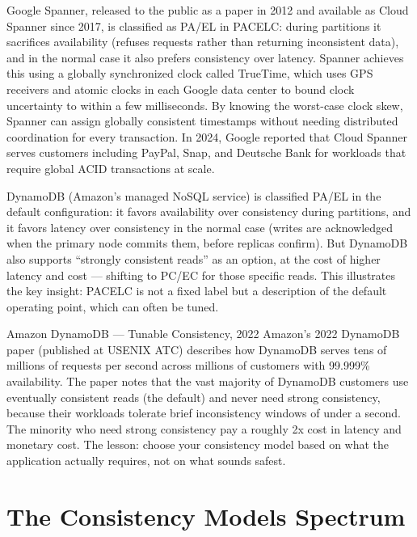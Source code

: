\documentclass[11pt,a4paper]{article}
\begin{document}
Google Spanner, released to the public as a paper in 2012 and available as Cloud Spanner since 2017, is classified as PA/EL in PACELC: during partitions it sacrifices availability (refuses requests rather than returning inconsistent data), and in the normal case it also prefers consistency over latency. Spanner achieves this using a globally synchronized clock called TrueTime, which uses GPS receivers and atomic clocks in each Google data center to bound clock uncertainty to within a few milliseconds. By knowing the worst-case clock skew, Spanner can assign globally consistent timestamps without needing distributed coordination for every transaction. In 2024, Google reported that Cloud Spanner serves customers including PayPal, Snap, and Deutsche Bank for workloads that require global ACID transactions at scale.

DynamoDB (Amazon's managed NoSQL service) is classified PA/EL in the default configuration: it favors availability over consistency during partitions, and it favors latency over consistency in the normal case (writes are acknowledged when the primary node commits them, before replicas confirm). But DynamoDB also supports ``strongly consistent reads'' as an option, at the cost of higher latency and cost --- shifting to PC/EC for those specific reads. This illustrates the key insight: PACELC is not a fixed label but a description of the default operating point, which can often be tuned.

\begin{industrybox}{Amazon DynamoDB --- Tunable Consistency, 2022}
Amazon's 2022 DynamoDB paper (published at USENIX ATC) describes how DynamoDB serves tens of millions of requests per second across millions of customers with 99.999\% availability. The paper notes that the vast majority of DynamoDB customers use eventually consistent reads (the default) and never need strong consistency, because their workloads tolerate brief inconsistency windows of under a second. The minority who need strong consistency pay a roughly 2x cost in latency and monetary cost. The lesson: choose your consistency model based on what the application actually requires, not on what sounds safest.
\end{industrybox}

\section{The Consistency Models Spectrum}
\end{document}
